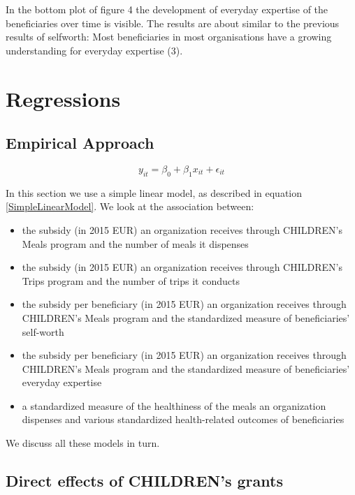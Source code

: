 \documentclass[12pt, a4paper, titlepage]{article}\usepackage[]{graphicx}\usepackage[]{color}
\begin{document}
In the bottom plot of figure 4 the development of everyday expertise of the beneficiaries over time is visible. The results are about similar to the previous results of selfworth: Most beneficiaries in most organisations have a growing understanding for everyday expertise (3). 

\section{Regressions}

\subsection{Empirical Approach} 

\begin{equation}
\label{SimpleLinearModel}
  y_{it} = \beta_0 + \beta_1 x_{it} + \epsilon_{it}
\end{equation}


In this section we use a simple linear model, as described in equation \ref{SimpleLinearModel}. We look at the association between: 

\begin{itemize}
  \item{the subsidy (in 2015 EUR) an organization receives through CHILDREN's Meals program and the number of meals it dispenses}
  \item{the subsidy (in 2015 EUR) an organization receives through CHILDREN's Trips program and the number of trips it conducts}
  \item{the subsidy per beneficiary (in 2015 EUR) an organization receives through CHILDREN's Meals program and the standardized measure of beneficiaries' self-worth}
  \item{the subsidy per beneficiary (in 2015 EUR) an organization receives through CHILDREN's Meals program and the standardized measure of beneficiaries' everyday expertise}
   \item{a standardized measure of the healthiness of the meals an organization dispenses and various standardized health-related outcomes of beneficiaries} 
\end{itemize}

We discuss all these models in turn.

\subsection{Direct effects of CHILDREN's grants} 
\end{document}
